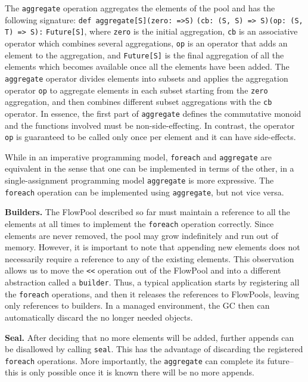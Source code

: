 The \verb=aggregate= operation aggregates the elements of the pool
and has the following signature: \verb+def aggregate[S]+\verb+(zero: =>S)+
\verb+(cb: (S, S) => S)+\verb+(op: (S, T) => S):+ \verb+Future[S]+,
where \verb=zero= is the initial aggregation, \verb=cb= is an
associative operator which combines several aggregations, \verb=op= is
an operator that adds an element to the aggregation, and
\verb=Future[S]= is the final aggregation of all the elements which
becomes available once all the elements have been added.
The \verb=aggregate= operator divides elements into subsets and applies the
aggregation operator \verb=op= to aggregate elements in each subset
starting from the \verb=zero= aggregation, and then combines
different subset aggregations with the \verb=cb= operator.
In essence, the first part of \verb=aggregate= defines the commutative
monoid and the functions involved must be non-side-effecting.
In contrast, the operator \verb=op= is guaranteed to be called only once per
element and it can have side-effects.

While in an imperative programming model, \verb=foreach= and \verb=aggregate= are
equivalent in the sense that one can be implemented in terms of the
other, in a single-assignment programming model \verb=aggregate= is more
expressive.
The \verb=foreach= operation can be implemented using \verb=aggregate=, but not vice versa.

\textbf{Builders.}
The FlowPool described so far must maintain a reference  to all the elements
at all times to implement the \verb=foreach= operation correctly. Since
elements are never removed, the pool may grow indefinitely and run out of
memory. However, it is important to note that appending new elements does not
necessarily require a reference to any of the existing elements. This
observation allows us to move the \verb=<<= operation out of the FlowPool and
into a different abstraction called a \verb=builder=. Thus, a typical
application starts by registering all the \verb=foreach= operations, and then
it releases the references to FlowPools, leaving only references to builders.
In a managed environment, the GC then can automatically discard the no longer
needed objects.


\textbf{Seal.}
After deciding that no more elements will be added,
further appends can be disallowed by calling \verb=seal=.
This has the advantage of discarding the registered \verb=foreach=
operations.
More importantly, the \verb=aggregate= can complete its future-- this is only possible
once it is known there will be no more appends.

